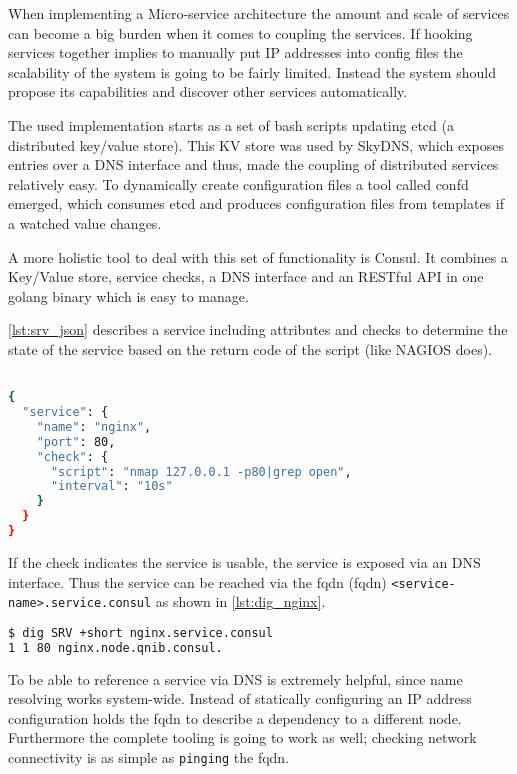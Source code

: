 When implementing a Micro-service architecture the amount and scale of services can become a big burden when it comes to coupling the services.
If hooking services together implies to manually put IP addresses into config files the scalability of the system is going to be fairly limited.
Instead the system should propose its capabilities and discover other services automatically.

The used implementation starts as a set of bash scripts updating etcd (a distributed key/value store). This KV store was used by SkyDNS, which exposes entries
over a DNS interface and thus, made the coupling of distributed services relatively easy. To dynamically create configuration files a tool called confd emerged, which consumes
etcd and produces configuration files from templates if a watched value changes.

A more holistic tool to deal with this set of functionality is Consul. It combines a Key/Value store, service checks, a DNS interface and an RESTful API
in one golang binary which is easy to manage.

\autoref{lst:srv_json} describes a service including attributes and checks to determine the state of the service based on the return code of the script (like NAGIOS does). 

\begin{lstlisting}[language=bash,
    caption={Service definition within consul. If the keyword open is not find within the nmap output the service is marked WARNING},
    label={lst:srv_json}]

{
  "service": {
    "name": "nginx",
    "port": 80,
    "check": {
      "script": "nmap 127.0.0.1 -p80|grep open",
      "interval": "10s"
    }
  }
}
\end{lstlisting}

If the check indicates the service is usable, the service is exposed via an DNS interface.
Thus the service can be reached via the \gls{fqdn} (\glsdesc{fqdn}) \lstinline{<service-name>.service.consul} as shown in \autoref{lst:dig_nginx}.
\begin{lstlisting}[language=bash,
    caption={Exposure of services via DNS.},
    label={lst:dig_nginx}]
$ dig SRV +short nginx.service.consul
1 1 80 nginx.node.qnib.consul.
\end{lstlisting}

To be able to reference a service via DNS is extremely helpful, since name resolving works system-wide. Instead of statically configuring an IP address
configuration holds the \gls{fqdn} to describe a dependency to a different node. Furthermore the complete tooling is going to work as well; checking network connectivity is as
simple as \lstinline{pinging} the \gls{fqdn}.

